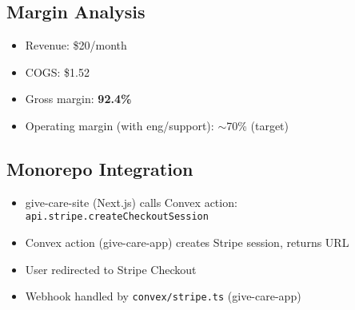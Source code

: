 \documentclass{article}
\begin{document}
\subsection*{Margin Analysis}
\begin{itemize}
    \item Revenue: \$20/month
    \item COGS: \$1.52
    \item Gross margin: \textbf{92.4\%}
    \item Operating margin (with eng/support): $\sim$70\% (target)
\end{itemize}

\subsection*{Monorepo Integration}
\begin{itemize}
    \item give-care-site (Next.js) calls Convex action: \texttt{api.stripe.createCheckoutSession}
    \item Convex action (give-care-app) creates Stripe session, returns URL
    \item User redirected to Stripe Checkout
    \item Webhook handled by \texttt{convex/stripe.ts} (give-care-app)
\end{itemize}
\end{document}
